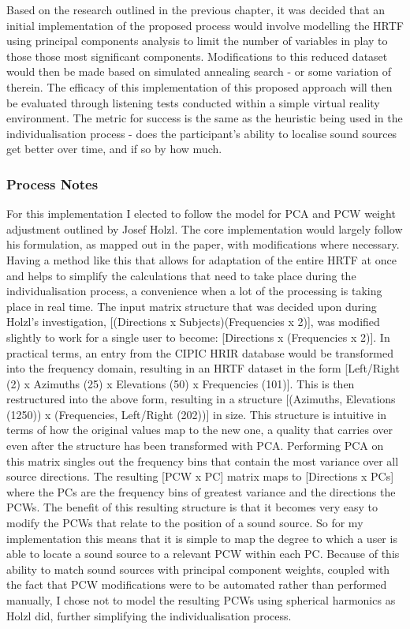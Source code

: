 Based on the research outlined in the previous chapter, it was decided that an initial implementation of the proposed process would involve modelling the HRTF using principal components analysis to limit the number of variables in play to those those most significant components. Modifications to this reduced dataset would then be made based on simulated annealing search - or some variation of therein. The efficacy of this implementation of this proposed approach will then be evaluated through listening tests conducted within a simple virtual reality environment. The metric for success is the same as the heuristic being used in the individualisation process - does the participant's ability to localise sound sources get better over time, and if so by how much.

\subsubsection{Process Notes}
For this implementation I elected to follow the model for PCA and PCW weight adjustment outlined by Josef Holzl\citep{Holzl2014a}. The core implementation would largely follow his formulation, as mapped out in the paper, with modifications where necessary. Having a method like this that allows for adaptation of the entire HRTF at once and helps to simplify the calculations that need to take place during the individualisation process, a convenience when a lot of the processing is taking place in real time. The input matrix structure that was decided upon during Holzl's investigation, [(Directions x Subjects)(Frequencies x 2)], was modified slightly to work for a single user to become: [Directions x (Frequencies x 2)]. In practical terms, an entry from the CIPIC HRIR database would be transformed into the frequency domain, resulting in an HRTF dataset in the form [Left/Right (2) x Azimuths (25) x Elevations (50) x Frequencies (101)]. This is then restructured into the above form, resulting in a structure [(Azimuths, Elevations (1250)) x (Frequencies, Left/Right (202))] in size. This structure is intuitive in terms of how the original values map to the new one, a quality that carries over even after the structure has been transformed with PCA. Performing PCA on this matrix singles out the frequency bins that contain the most variance over all source directions. The resulting [PCW x PC] matrix maps to [Directions x PCs] where the PCs are the frequency bins of greatest variance and the directions the PCWs. The benefit of this resulting structure is that it becomes very easy to modify the PCWs that relate to the position of a sound source. So for my implementation this means that it is simple to map the degree to which a user is able to locate a sound source to a relevant PCW within each PC. Because of this ability to match sound sources with principal component weights, coupled with the fact that PCW modifications were to be automated rather than performed manually, I chose not to model the resulting PCWs using spherical harmonics as Holzl did, further simplifying the individualisation process. 

